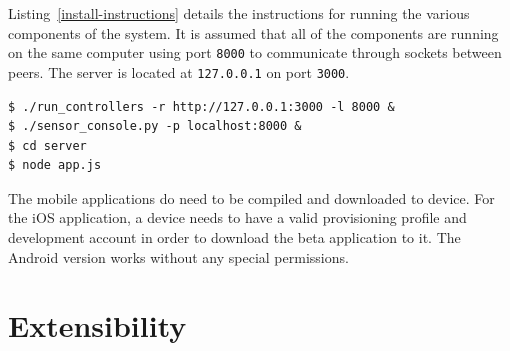 \documentclass{article}
\begin{document}
Listing~\ref{install-instructions} details the instructions for running the
various components of the system. It is assumed that all of the components are
running on the same computer using port \texttt{8000} to communicate through
sockets between peers. The server is located at \texttt{127.0.0.1} on port
\texttt{3000}.

\begin{lstlisting}
$ ./run_controllers -r http://127.0.0.1:3000 -l 8000 & 
$ ./sensor_console.py -p localhost:8000 &
$ cd server
$ node app.js
\end{lstlisting}

The mobile applications do need to be compiled and downloaded to device. For
the iOS application, a device needs to have a valid provisioning profile and
development account in order to download the beta application to it. The
Android version works without any special permissions.

\section{Extensibility} %
\end{document}
